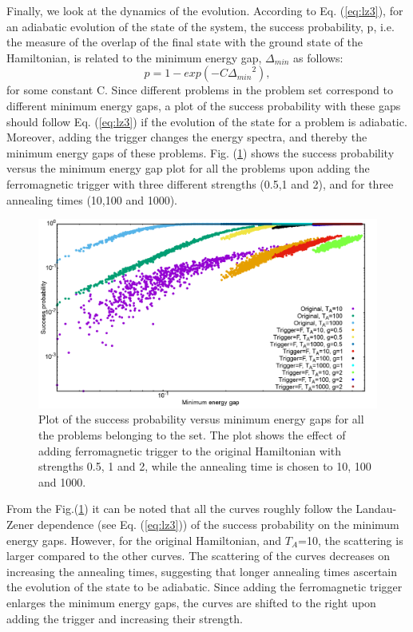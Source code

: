 \documentclass[../main.tex]{subfiles}
\begin{document}
Finally, we look at the dynamics of the evolution. According to Eq. (\ref{eq:lz3}), for an adiabatic evolution of the state of the system, the success probability, p, i.e. the measure of the overlap of the final state with the ground state of the Hamiltonian, is related to the minimum energy gap, $\Delta_{min}$ as follows:
\begin{equation}
p=1-exp(-C{\Delta_{min}}^2),
\end{equation}
for some constant C. Since different problems in the problem set correspond to different minimum energy gaps, a plot of the success probability with these gaps should follow Eq. (\ref{eq:lz3}) if the evolution of the state for a problem is adiabatic. Moreover, adding the trigger changes the energy spectra, and thereby the minimum energy gaps of these problems. Fig. (\ref{fig:f14}) shows the success probability versus the minimum energy gap plot for all the problems upon adding the ferromagnetic trigger with three different strengths (0.5,1 and 2), and for three annealing times (10,100 and 1000).

\begin{figure}[H]
\centering
\includegraphics[scale=0.24]{SuccVsGap_OF_g.png}
\caption{Plot of the success probability versus minimum energy gaps for all the problems belonging to the set. The plot shows the effect of adding ferromagnetic trigger to the original Hamiltonian with strengths 0.5, 1 and 2, while the annealing time is chosen to 10, 100 and 1000.}
\label{fig:f14}
\end{figure} 

From the Fig.(\ref{fig:f14}) it can be noted that all the curves roughly follow the Landau-Zener dependence (see Eq. (\ref{eq:lz3})) of the success probability on the minimum energy gaps. However, for the original Hamiltonian, and $T_A$=10, the scattering is larger compared to the other curves. The scattering of the curves decreases on increasing the annealing times, suggesting that longer annealing times ascertain the evolution of the state to be adiabatic. Since adding the ferromagnetic trigger enlarges the minimum energy gaps, the curves are shifted to the right upon adding the trigger and increasing their strength. 
\end{document}
